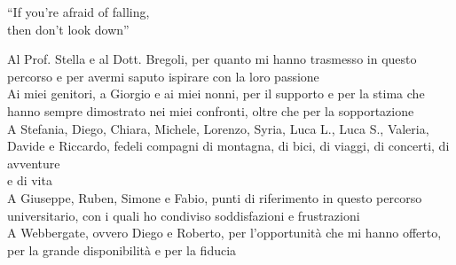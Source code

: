 \begingroup
  \let\clearpage\endgroup
  \null{}
  \begin{minipage}{5.3in}
  
    \begin{flushright}
      \begin{em}
        ``If you're afraid of falling,\\then don't look down''
      \end{em}

      \vspace{4cm}

      \begin{em}
        Al Prof. Stella e al Dott. Bregoli, per quanto mi hanno trasmesso in questo percorso e 
        per avermi saputo ispirare con la loro passione\\[10pt]
        Ai miei genitori, a Giorgio e ai miei nonni, per il supporto e per la stima che hanno sempre dimostrato nei miei confronti,
        oltre che per la sopportazione\\[10pt]
        A Stefania, Diego, Chiara, Michele, Lorenzo, Syria, Luca L., Luca S., Valeria, Davide e Riccardo, fedeli compagni di montagna, di bici,
        di viaggi, di concerti, di avventure\\e di vita\\[10pt]
        A Giuseppe, Ruben, Simone e Fabio, punti di riferimento in questo percorso universitario,
        con i quali ho condiviso soddisfazioni e frustrazioni\\[10pt]
        A Webbergate, ovvero Diego e Roberto, per l'opportunità che mi hanno offerto, per la grande disponibilità e per 
        la fiducia
      \end{em}
    \end{flushright}
  \end{minipage}
   \null
\endgroup